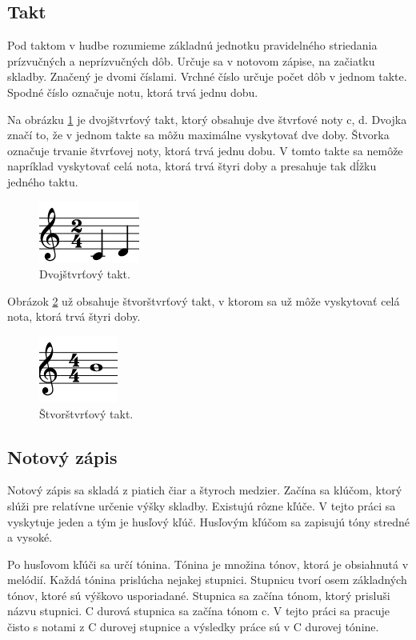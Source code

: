 \subsection{Takt}
Pod taktom v hudbe rozumieme základnú jednotku pravidelného striedania prízvučných a neprízvučných dôb. Určuje sa v notovom zápise, na začiatku skladby. Značený je dvomi číslami. Vrchné číslo určuje počet dôb v jednom takte. Spodné číslo označuje notu, ktorá trvá jednu dobu.

Na obrázku \ref{fig:dvojst} je dvojštvrťový takt, ktorý obsahuje dve štvrťové noty c, d. Dvojka značí to, že v jednom takte sa môžu maximálne vyskytovať dve doby. Štvorka označuje trvanie štvrťovej noty, ktorá trvá jednu dobu. V tomto takte sa nemôže napríklad vyskytovať celá nota, ktorá trvá štyri doby a presahuje tak dĺžku jedného taktu.

\begin{figure}[H]
\centering
\includegraphics[scale=0.4]{obrazky-figures/dvojst.png}
\caption{Dvojštvrťový takt.}
\label{fig:dvojst}
\end{figure}


Obrázok \ref{fig:trojst} už obsahuje štvorštvrťový takt, v ktorom sa už môže vyskytovať celá nota, ktorá trvá štyri doby.

\begin{figure}[H]
\centering
\includegraphics[scale=0.4]{obrazky-figures/cela.png}
\caption{Štvorštvrťový takt.}
\label{fig:trojst}
\end{figure}

\subsection{Notový zápis}
Notový zápis sa skladá z piatich čiar a štyroch medzier. Začína sa klúčom, ktorý slúži pre relatívne určenie výšky skladby. Existujú rôzne kľúče. V tejto práci sa vyskytuje jeden a tým je husľový kľúč. Husľovým kľúčom sa zapisujú tóny stredné a vysoké. 

Po husľovom kľúči sa určí tónina. Tónina je množina tónov, ktorá je obsiahnutá v melódií. Každá tónina prislúcha nejakej stupnici. Stupnicu tvorí osem základných tónov, ktoré sú výškovo usporiadané. Stupnica sa začína tónom, ktorý prisluši názvu stupnici. C durová stupnica sa začína tónom c. V tejto práci sa pracuje čisto s notami z C durovej stupnice a výsledky práce sú v C durovej tónine.

